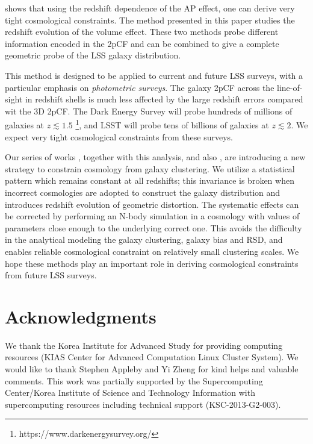 \documentclass[iop]{emulateapj}
\begin{document}
 

\cite{Li2015,Li2016} shows that using the redshift dependence of the AP effect, 
one can derive very tight cosmological constraints.
The method presented in this paper studies the redshift evolution of the volume effect.
These two methods probe different information encoded in the 2pCF 
and can be combined to give a complete geometric probe of the LSS galaxy distribution.

This method is designed to be applied to current and future LSS surveys,
with a particular emphasis on {\it photometric surveys}.
The galaxy 2pCF across the line-of-sight in redshift shells is much less affected by the large redshift errors compared wit the 3D 2pCF.
The Dark Energy Survey will probe hundreds of millions of galaxies at $z\lesssim1.5$
\footnote{https://www.darkenergysurvey.org/}, 
and LSST will probe tens of billions of galaxies at $z\lesssim2$.
We expect very tight cosmological constraints from these surveys.


Our series of works \cite{Li2014,Li2015,Li2016}, together with this analysis, 
and also \cite{topology,MS2016},
are introducing a new strategy to constrain cosmology from galaxy clustering.
We utilize a statistical pattern which remains constant at all redshifts;
this invariance is broken when incorrect cosmologies are adopted to construct the galaxy distribution
and introduces redshift evolution of geometric distortion.
The systematic effects can be corrected by performing an N-body simulation 
in a cosmology with values of parameters close enough to the underlying correct one.
This avoids the difficulty in the analytical modeling the galaxy clustering, galaxy bias and RSD,
and enables reliable cosmological constraint on relatively small clustering scales.
We hope these methods play an important role in deriving cosmological constraints from future LSS surveys.

 
 
\section*{Acknowledgments}

We thank the Korea Institute for Advanced Study for providing computing resources (KIAS Center for Advanced Computation Linux Cluster System).
We would like to thank Stephen Appleby and Yi Zheng for kind helps and valuable comments.
This work was partially supported by the
Supercomputing Center/Korea Institute of Science and
Technology Information with supercomputing resources
including technical support (KSC-2013-G2-003).
\end{document}
